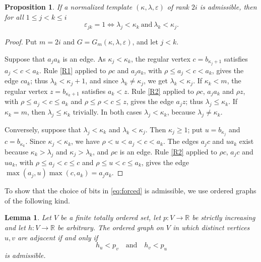 \documentclass[11pt]{amsart}
\newtheorem{proposition}[theorem]{Proposition}
\newtheorem{lemma}[theorem]{Lemma}
\theoremstyle{definition}
\theoremstyle{remark}
\numberwithin{equation}{section}
\begin{document}
\begin{proposition}\label{prop:forced}
If a normalized template $(\kappa,\lambda,\varepsilon)$ of rank $2i$ is admissible, then for all $1\le j<k\le i$
\begin{equation}\label{eq:forced}
\varepsilon_{jk}=1\iff\lambda_j<\kappa_k\ \text{and}\ \lambda_k<\kappa_j.
\end{equation}
\end{proposition}

\begin{proof}
Put $m=2i$ and $G=G_m(\kappa,\lambda,\varepsilon)$, and let $j<k$.

Suppose that $a_ja_k$ is an edge. As $\kappa_j<\kappa_k$, the regular vertex $c=b_{\kappa_j+1}$ satisfies $a_j<c<a_k$. Rule \ref{R1} applied to $\rho c$ and $a_ja_k$, with $\rho\le a_j<c<a_k$, gives the edge $ca_k$; thus $\lambda_k<\kappa_j+1$, and since $\lambda_k\ne\kappa_j$, we get $\lambda_k<\kappa_j$. If $\kappa_k<m$, the regular vertex $z=b_{\kappa_k+1}$ satisfies $a_k<z$. Rule \ref{R2} applied to $\rho c$, $a_ja_k$ and $\rho z$, with $\rho\le a_j<c\le a_k$ and $\rho\le\rho<c\le z$, gives the edge $a_jz$; thus $\lambda_j\le\kappa_k$. If $\kappa_k=m$, then $\lambda_j\le\kappa_k$ trivially. In both cases $\lambda_j<\kappa_k$, because $\lambda_j\ne\kappa_k$.

Conversely, suppose that $\lambda_j<\kappa_k$ and $\lambda_k<\kappa_j$. Then $\kappa_j\ge1$; put $u=b_{\kappa_j}$ and $c=b_{\kappa_k}$. Since $\kappa_j<\kappa_k$, we have $\rho<u<a_j<c<a_k$. The edges $a_jc$ and $ua_k$ exist because $\kappa_k>\lambda_j$ and $\kappa_j>\lambda_k$, and $\rho c$ is an edge. Rule \ref{R2} applied to $\rho c$, $a_jc$ and $ua_k$, with $\rho\le a_j<c\le c$ and $\rho\le u<c\le a_k$, gives the edge $\max(a_j,u)\max(c,a_k)=a_ja_k$.
\end{proof}

To show that the choice of bits in \eqref{eq:forced} is admissible, we use ordered graphs of the following kind.

\begin{lemma}\label{lem:two-endpoint}
Let $V$ be a finite totally ordered set, let $p\colon V\to\mathbb R$ be strictly increasing and let $h\colon V\to\mathbb R$ be arbitrary. The ordered graph on $V$ in which distinct vertices $u,v$ are adjacent if and only if
\begin{equation}\label{eq:two-endpoint}
h_u<p_v\quad\text{and}\quad h_v<p_u
\end{equation}
is admissible.
\end{lemma}
\end{document}
